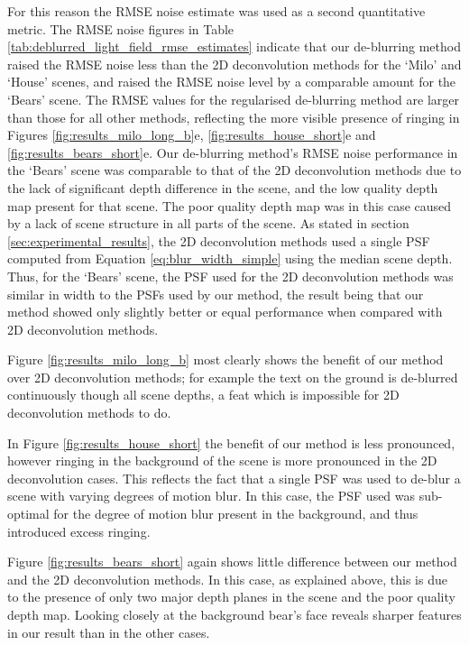 For this reason the RMSE noise estimate was used as a second quantitative metric.
The RMSE noise figures in Table \ref{tab:deblurred_light_field_rmse_estimates} indicate that our de-blurring method raised the RMSE noise less than the 2D deconvolution methods for the \enquote*{Milo} and \enquote*{House} scenes, and raised the RMSE noise level by a comparable amount for the \enquote*{Bears} scene.
The RMSE values for the regularised de-blurring method are larger than those for all other methods, reflecting the more visible presence of ringing in Figures \ref{fig:results_milo_long_b}e, \ref{fig:results_house_short}e and \ref{fig:results_bears_short}e.
Our de-blurring method's RMSE noise performance in the \enquote*{Bears} scene was comparable to that of the 2D deconvolution methods due to the lack of significant depth difference in the scene, and the low quality depth map present for that scene.
The poor quality depth map was in this case caused by a lack of scene structure in all parts of the scene.
As stated in section \ref{sec:experimental_results}, the 2D deconvolution methods used a single PSF computed from Equation \ref{eq:blur_width_simple} using the median scene depth.
Thus, for the \enquote*{Bears} scene, the PSF used for the 2D deconvolution methods was similar in width to the PSFs used by our method, the result being that our method showed only slightly better or equal performance when compared with 2D deconvolution methods.

Figure \ref{fig:results_milo_long_b} most clearly shows the benefit of our method over 2D deconvolution methods; for example the text on the ground is de-blurred continuously though all scene depths, a feat which is impossible for 2D deconvolution methods to do.

In Figure \ref{fig:results_house_short} the benefit of our method is less pronounced, however ringing in the background of the scene is more pronounced in the 2D deconvolution cases.
This reflects the fact that a single PSF was used to de-blur a scene with varying degrees of motion blur.
In this case, the PSF used was sub-optimal for the degree of motion blur present in the background, and thus introduced excess ringing.

Figure \ref{fig:results_bears_short} again shows little difference between our method and the 2D deconvolution methods.
In this case, as explained above, this is due to the presence of only two major depth planes in the scene and the poor quality depth map.
Looking closely at the background bear's face reveals sharper features in our result than in the other cases.

